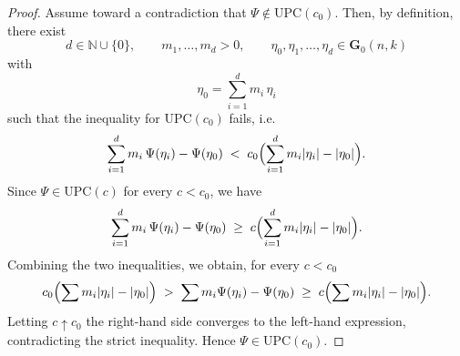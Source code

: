 \documentclass[10pt,a4paper]{amsart}
\newcommand{\UPC}{\mathrm{UPC}}
\newcommand{\nat}{\natp \cup \{0\}}
\newcommand{\natp}{\mathbb{N}}
\newcommand{\ograss}[2]{\mathbf{G}_0(#1,#2)}
\begin{document}
\begin{proof}
    Assume toward a contradiction that $\Psi\notin\UPC(c_0)$.  
    Then, by definition, there exist
    \[
        d\in\nat,\qquad m_1,\ldots,m_d>0,\qquad
        \eta_0,\eta_1,\ldots,\eta_d\in\ograss nk
    \]
    with
    \[
        \eta_0=\sum_{i=1}^d m_i\,\eta_i
    \]
    such that the inequality for $\UPC(c_0)$ fails, i.e.
    \[
        \sum_{i=1}^d m_i\,\Psi(\eta_i)-\Psi(\eta_0)
        \;<\;
        c_0\Bigl(\sum_{i=1}^d m_i|\eta_i|-|\eta_0|\Bigr).
    \]
    Since $\Psi\in\UPC(c)$ for every $c<c_0$, we have
    \[
        \sum_{i=1}^d m_i\,\Psi(\eta_i)-\Psi(\eta_0)
        \;\ge\;
        c\Bigl(\sum_{i=1}^d m_i|\eta_i|-|\eta_0|\Bigr).
    \]
    Combining the two inequalities, we obtain, for every $c<c_0$
    \[
        c_0\Bigl(\sum m_i|\eta_i|-|\eta_0|\Bigr)
        \;>\;
        \sum m_i\Psi(\eta_i)-\Psi(\eta_0)
        \;\ge\;
        c\Bigl(\sum m_i|\eta_i|-|\eta_0|\Bigr).
    \]
    Letting $c\uparrow c_0$ the right-hand side converges to the left-hand 
    expression, contradicting the strict inequality. Hence 
    $\Psi\in\UPC(c_0)$.
\end{proof}
\end{document}

